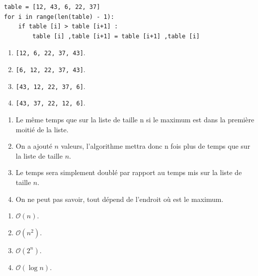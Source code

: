 \begin{lstlisting}
table = [12, 43, 6, 22, 37]
for i in range(len(table) - 1):
    if table [i] > table [i+1] :
        table [i] ,table [i+1] = table [i+1] ,table [i]
\end{lstlisting}
\begin{enumerate}
\item \texttt{[12, 6, 22, 37, 43]}.%
\item \texttt{[6, 12, 22, 37, 43]}.
\item \texttt{[43, 12, 22, 37, 6]}.
\item \texttt{[43, 37, 22, 12, 6]}.
\end{enumerate}


\begin{enumerate}
\item Le même temps que sur la liste de taille n si le maximum est dans la première moitié de la liste.
\item On a ajouté $n$ valeurs, l'algorithme mettra donc n fois plus de temps que sur la liste de taille $n$.
\item Le temps sera simplement doublé par rapport au temps mis sur la liste de taille $n$.%
\item On ne peut pas savoir, tout dépend de l'endroit où est le maximum.
\end{enumerate}


\begin{enumerate}
\item $\mathcal{O}(n)$.
\item $\mathcal{O}\left(n^2\right)$.%
\item $\mathcal{O}\left(2^n\right)$.
\item $\mathcal{O}\left(\log n\right)$.
\end{enumerate}

